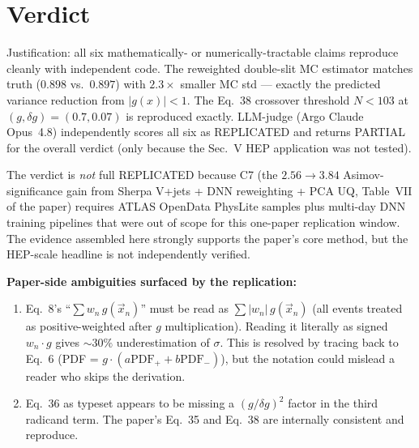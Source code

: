 \documentclass[11pt,letterpaper]{article}
\begin{document}
\section{Verdict}

\noindent{}

\medskip
Justification: all six mathematically- or numerically-tractable claims reproduce cleanly
with independent code. The reweighted double-slit MC estimator matches truth
($0.898$ vs.\ $0.897$) with $2.3\times$ smaller MC std --- exactly the predicted variance
reduction from $|g(x)| < 1$. The Eq.~38 crossover threshold $N < 103$ at
$(g, \delta g) = (0.7, 0.07)$ is reproduced exactly. LLM-judge (Argo Claude Opus~4.8)
independently scores all six as REPLICATED and returns PARTIAL for the overall verdict
(only because the Sec.~V HEP application was not tested).

\medskip
The verdict is \emph{not} full REPLICATED because C7 (the $2.56 \to 3.84$ Asimov-significance
gain from Sherpa V+jets + DNN reweighting + PCA UQ, Table~VII of the paper) requires ATLAS
OpenData PhysLite samples plus multi-day DNN training pipelines that were out of scope for
this one-paper replication window. The evidence assembled here strongly supports the paper's
core method, but the HEP-scale headline is not independently verified.

\medskip
\textbf{Paper-side ambiguities surfaced by the replication:}
\begin{enumerate}
  \item Eq.~8's ``$\sum w_n \, g(\vec x_n)$'' must be read as $\sum |w_n| \, g(\vec x_n)$
    (all events treated as positive-weighted after $g$ multiplication). Reading it literally
    as signed $w_n \cdot g$ gives $\sim 30\%$ underestimation of $\sigma$. This is resolved by
    tracing back to Eq.~6 (PDF = $g \cdot (a \mathrm{PDF}_+ + b \mathrm{PDF}_-)$), but the notation
    could mislead a reader who skips the derivation.
  \item Eq.~36 as typeset appears to be missing a $(g/\delta g)^2$ factor in the third
    radicand term. The paper's Eq.~35 and Eq.~38 are internally consistent and reproduce.
\end{enumerate}
\end{document}
